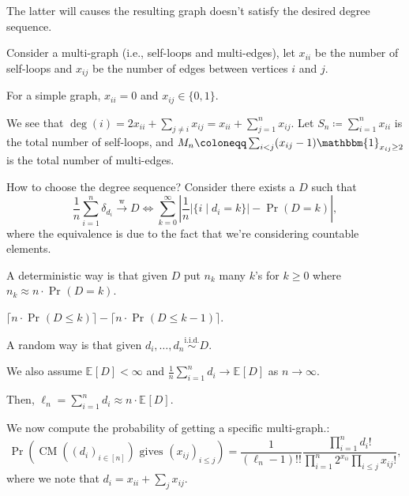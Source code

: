 \begin{problem*}
	The latter will causes the resulting graph doesn't satisfy the desired degree sequence.
\end{problem*}

Consider a multi-graph (i.e., self-loops and multi-edges), let \(x_{ii}\) be the number of self-loops and \(x_{ij}\) be the number of edges between vertices \(i\) and \(j\).

\begin{eg}
	For a simple graph, \(x_{ii} = 0\) and \(x_{ij} \in \{ 0, 1 \} \).
\end{eg}

We see that \(\deg (i) = 2 x_{ii} + \sum_{j \neq i} x_{ij} = x_{ii} + \sum_{j=1}^{n} x_{ij}\). Let \(S_n \coloneqq \sum_{i=1}^{n} x_{ii}\) is the total number of self-loops, and \(M_n \coloneqq \sum_{i < j} (x_{ij} - 1) \mathbbm{1}_{x_{ij} \geq 2} \) is the total number of multi-edges.

How to choose the degree sequence? Consider there exists a \(D\) such that
\[
	\frac{1}{n}\sum_{i=1}^{n} \delta _{d_i}
	\overset{\text{w} }{\to} D
	\iff \sum_{k=0}^{\infty} \left\lvert \frac{1}{n} \lvert \{ i \mid d_i = k \} \rvert - \Pr_{}\left(D = k\right) \right\rvert,
\]
where the equivalence is due to the fact that we're considering countable elements.

A deterministic way is that given \(D\) put \(n_k\) many \(k\)'s for \(k \geq 0\) where \(n_k \approx n \cdot \Pr_{}\left(D = k\right) \).

\begin{eg}
	\(\lceil n \cdot \Pr_{}\left(D \leq k\right) \rceil - \lceil n \cdot \Pr_{}\left(D \leq k-1\right) \rceil\).
\end{eg}

A random way is that given \(d_i, \dots , d_n \overset{\text{i.i.d.} }{\sim } D\).

We also assume \(\mathbb{E}_{}[D] < \infty \) and \(\frac{1}{n}\sum_{i=1}^{n} d_i \to \mathbb{E}_{}[D] \) as \(n \to \infty \).

Then, \(\ell _n = \sum_{i=1}^{n} d_i \approx n \cdot \mathbb{E}_{}[D] \).

We now compute the probability of getting a specific multi-graph.:
\[
	\Pr_{}\left(\operatorname{CM}((d_i)_{i \in [n]}) \text{ gives } (x_{ij} )_{i \leq j} \right)
	= \frac{1}{(\ell _n - 1) !!} \frac{\prod_{i=1}^{n} d_i !}{\prod_{i=1}^{n} 2^{x_{ii}} \prod_{i \leq j} x_{ij} !},
\]
where we note that \(d_i = x_{ii} + \sum_{j} x_{ij}\).

